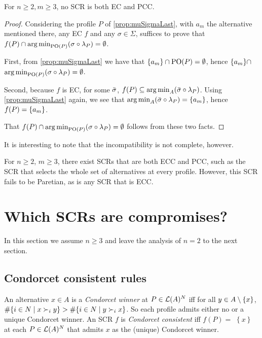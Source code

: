\begin{theorem} \label{th:incompatibility} 
	For $n ≥ 2, m ≥ 3$, no \ac{SCR} is both EC and PCC.
\end{theorem}
\begin{proof}	
	Considering the profile $P$ of \cref{prop:muSigmaLast}, with $a_m$ the alternative mentioned there, any EC $f$ and any $\sigma \in \Sigma$, suffices to prove that $f(P) \cap {\mustar[\sigma][P]} = \emptyset$.
	
	First, from \cref{prop:muSigmaLast} we have that
	$\{a_m\} \cap \text{PO}(P) = \emptyset$, hence $\{a_m\} \cap$ \break $ {\mustar[\sigma][P]} = \emptyset$. 
	
	Second, because $f$ is EC, for some $\bar{\sigma}$, $f(P) \subseteq {\musigma[\sigmatop][P]}$. Using \cref{prop:muSigmaLast} again, we see that ${\musigma[\sigmatop][P]} = \set{a_m}$, hence $f(P) = \{a_m\}$.
	
	That $f(P) \cap {\mustar[\sigma][P]} = \emptyset$ follows from these two facts.
\end{proof}

It is interesting to note that the incompatibility is not complete, however.

\begin{remark}
	For $n ≥ 2$, $m ≥ 3$, there exist \acp{SCR} that are both ECC and PCC, such as the \ac{SCR} that selects the whole set of alternatives at every profile. However, this \ac{SCR} fails to be Paretian, as is any \ac{SCR} that is ECC.
\end{remark}


\section{Which \acp{SCR} are compromises?}
\label{sec:more2voters}
In this section we assume $n\geq 3$ and leave the analysis of $n=2$ to the
next section.

\subsection{Condorcet consistent rules}

An alternative $x\in A$ is a \emph{Condorcet winner} at $P\in \mathcal{L}(A)^N$ iff for all $y\in A \setminus \{x\} $, $\#\set{i \in N \suchthat x \prefi y} >\#\set{i \in N \suchthat y \prefi x}$. So each profile admits
either no or a unique Condorcet winner. An \ac{SCR} $f$ is \emph{Condorcet
	consistent} iff $f(P)=$ $\left\{ x\right\} $ at each $P\in \mathcal{L}(A)^N$ that
admits $x$ as the (unique) Condorcet winner.

